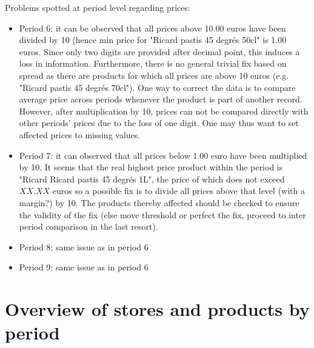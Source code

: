 \documentclass[11pt]{article}
\begin{document}
Problems spotted at period level regarding prices:
\begin{itemize}
\item Period 6: it can be observed that all prices above 10.00 euros have been divided by 10 (hence min price for "Ricard pastis 45 degrés 50cl" is 1.00 euros. Since only two digits are provided after decimal point, this induces a loss in information. Furthermore, there is no general trivial fix based on spread as there are products for which all prices are above 10 euros (e.g. "Ricard pastis 45 degrés 70cl"). One way to correct the data is to compare average price across periods whenever the product is part of another record. However, after multiplication by 10, prices can not be compared directly with other periods' prices due to the loss of one digit. One may thus want to set affected prices to missing values.
\item Period 7:  it can observed that all prices below 1.00 euro have been multiplied by 10. It seems that the real highest price product within the period is "Ricard Ricard pastis 45 degrés 1L", the price of which does not exceed $XX.XX$ euros so a possible fix is to divide all prices above that level (with a margin?) by 10. The products thereby affected should be checked to ensure the validity of the fix (else move threshold or perfect the fix, proceed to inter period comparison in the last resort).
\item Period 8: same issue as in period 6
\item Period 9: same issue as in period 6
\end{itemize}

\section{Overview of stores and products by period}
\end{document}
